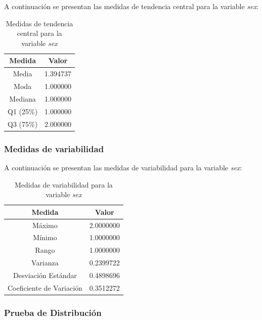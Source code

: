 \documentclass[a4paper,12pt]{article}
\begin{document}
A continuación se presentan las medidas de tendencia central para la variable \textit{sex}:

\begin{table}[h!]
    \centering
    \begin{tabular}{|c|c|}
        \hline
        \textbf{Medida} & \textbf{Valor} \\
        \hline
        Media & 1.394737 \\
        \hline
        Moda & 1.000000 \\
        \hline
        Mediana & 1.000000 \\
        \hline
        Q1 (25\%) & 1.000000 \\
        \hline
        Q3 (75\%) & 2.000000 \\
        \hline
    \end{tabular}
    \caption{Medidas de tendencia central para la variable \textit{sex}}
    \label{tab:medidas_tendencia_central_sex}
\end{table}

\subsubsection*{Medidas de variabilidad}

A continuación se presentan las medidas de variabilidad para la variable \textit{sex}:

\begin{table}[h!]
    \centering
    \begin{tabular}{|c|c|}
        \hline
        \textbf{Medida} & \textbf{Valor} \\
        \hline
        Máximo & 2.0000000 \\
        \hline
        Mínimo & 1.0000000 \\
        \hline
        Rango & 1.0000000 \\
        \hline
        Varianza & 0.2399722 \\
        \hline
        Desviación Estándar & 0.4898696 \\
        \hline
        Coeficiente de Variación & 0.3512272 \\
        \hline
    \end{tabular}
    \caption{Medidas de variabilidad para la variable \textit{sex}}
    \label{tab:medidas_variabilidad_sex}
\end{table}
    
    \subsubsection*{Prueba de Distribución}
\end{document}

